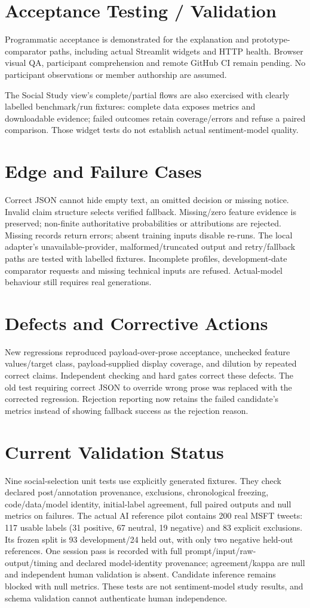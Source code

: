 \section{Acceptance Testing / Validation}
Programmatic acceptance is demonstrated for the explanation and prototype-comparator paths, including actual Streamlit widgets and HTTP health. Browser visual QA, participant comprehension and remote GitHub CI remain pending. No participant observations or member authorship are assumed.

The Social Study view's complete/partial flows are also exercised with clearly labelled benchmark/run fixtures: complete data exposes metrics and downloadable evidence; failed outcomes retain coverage/errors and refuse a paired comparison. Those widget tests do not establish actual sentiment-model quality.
\section{Edge and Failure Cases}
Correct JSON cannot hide empty text, an omitted decision or missing notice. Invalid claim structure selects verified fallback. Missing/zero feature evidence is preserved; non-finite authoritative probabilities or attributions are rejected. Missing records return errors; absent training inputs disable re-runs. The local adapter's unavailable-provider, malformed/truncated output and retry/fallback paths are tested with labelled fixtures. Incomplete profiles, development-date comparator requests and missing technical inputs are refused. Actual-model behaviour still requires real generations.
\section{Defects and Corrective Actions}
New regressions reproduced payload-over-prose acceptance, unchecked feature values/target class, payload-supplied display coverage, and dilution by repeated correct claims. Independent checking and hard gates correct these defects. The old test requiring correct JSON to override wrong prose was replaced with the corrected regression. Rejection reporting now retains the failed candidate's metrics instead of showing fallback success as the rejection reason.
\section{Current Validation Status}
Nine social-selection unit tests use explicitly generated fixtures. They check declared post/annotation provenance, exclusions, chronological freezing, code/data/model identity, initial-label agreement, full paired outputs and null metrics on failures. The actual AI reference pilot contains 200 real MSFT tweets: 117 usable labels (31 positive, 67 neutral, 19 negative) and 83 explicit exclusions. Its frozen split is 93 development/24 held out, with only two negative held-out references. One session pass is recorded with full prompt/input/raw-output/timing and declared model-identity provenance; agreement/kappa are null and independent human validation is absent. Candidate inference remains blocked with null metrics. These tests are not sentiment-model study results, and schema validation cannot authenticate human independence.

